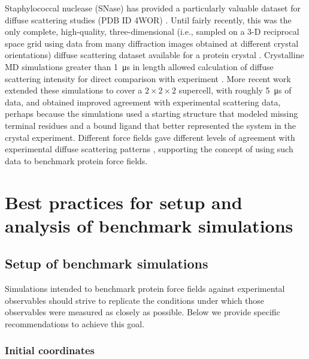 \documentclass[9pt,review,pubversion]{livecoms}
\begin{document}
Staphylococcal nuclease (SNase) has provided a particularly valuable dataset for diffuse scattering studies (PDB ID 4WOR) \cite{wall_three-dimensional_1997}.
Until fairly recently, this was the only complete, high-quality, three-dimensional (i.e., sampled on a 3-D reciprocal space grid using data from many diffraction images obtained at different crystal orientations) diffuse scattering dataset available for a protein crystal \cite{wall_conformational_2014}.
Crystalline MD simulations greater than \qty{1}{\micro\second} in length allowed calculation of diffuse scattering intensity for direct comparison with experiment \cite{wall_conformational_2014}.
More recent work \cite{wall_internal_2018} extended these simulations to cover a $2 \times 2 \times 2$ supercell, with roughly \qty{5}{\micro\second} of data, and obtained improved agreement with experimental scattering data, perhaps because the simulations used a starting structure that modeled missing terminal residues and a bound ligand that better represented the system in the crystal experiment.
Different force fields gave different levels of agreement with experimental diffuse scattering patterns \cite{wych_liquid-like_2019}, supporting the concept of using such data to benchmark protein force fields.

\section{Best practices for setup and analysis of benchmark simulations}
\label{sec:best_practices}

\subsection{Setup of benchmark simulations}
\label{sub:best_practices_setup}

Simulations intended to benchmark protein force fields against experimental observables should strive to replicate the conditions under which those observables were measured as closely as possible. Below we provide specific recommendations to achieve this goal.

\subsubsection{Initial coordinates}
\label{sub2:initial_coordinates}
\end{document}
